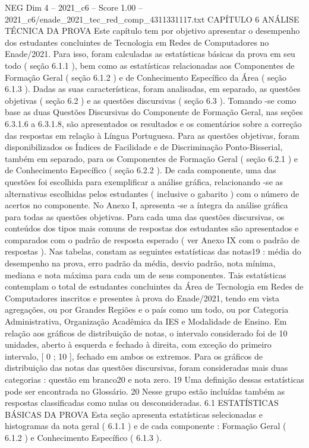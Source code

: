\begin{textsample}{NEG Dim 4 – 2021\_c6 – Score 1.00 – 2021\_c6/enade\_2021\_tec\_red\_comp\_4311331117.txt}  \label{ex:f4_neg_289}
CAPÍTULO 6 ANÁLISE TÉCNICA DA PROVA Este capítulo tem por objetivo apresentar o desempenho dos estudantes concluintes de Tecnologia em Redes de Computadores no Enade/2021.
Para isso, foram calculadas as estatísticas básicas da prova em seu todo ( seção 6.1.1 ), bem como as estatísticas relacionadas aos Componentes de Formação Geral ( seção 6.1.2 ) e de Conhecimento Específico da Área ( seção 6.1.3 ).
Dadas as suas características, foram analisadas, em separado, as questões objetivas ( seção 6.2 ) e as questões discursivas ( seção 6.3 ).
Tomando -se como base as duas Questões Discursivas do Componente de Formação Geral, nas seções 6.3.1.6 a 6.3.1.8, são apresentados os resultados e os comentários sobre a correção das respostas em relação à Língua Portuguesa.
Para as questões objetivas, foram disponibilizados os Índices de Facilidade e de Discriminação Ponto-Bisserial, também em separado, para os Componentes de Formação Geral ( seção 6.2.1 ) e de Conhecimento Específico ( seção 6.2.2 ).
De cada componente, uma das questões foi escolhida para exemplificar a análise gráfica, relacionando -se as alternativas escolhidas pelos estudantes ( inclusive o gabarito ) com o número de acertos no componente.
No Anexo I, apresenta -se a íntegra da análise gráfica para todas as questões objetivas.
Para cada uma das questões discursivas, os conteúdos dos tipos mais comuns de respostas dos estudantes são apresentados e comparados com o padrão de resposta esperado ( ver Anexo IX com o padrão de respostas ).
Nas tabelas, constam as seguintes estatísticas das notas19 : média do desempenho na prova, erro padrão da média, desvio padrão, nota mínima, mediana e nota máxima para cada um de seus componentes.
Tais estatísticas contemplam o total de estudantes concluintes da Área de Tecnologia em Redes de Computadores inscritos e presentes à prova do Enade/2021, tendo em vista agregações, ou por Grandes Regiões e o país como um todo, ou por Categoria Administrativa, Organização Acadêmica da IES e Modalidade de Ensino.
Em relação aos gráficos de distribuição de notas, o intervalo considerado foi de 10 unidades, aberto à esquerda e fechado à direita, com exceção do primeiro intervalo, [ 0 ; 10 ], fechado em ambos os extremos.
Para os gráficos de distribuição das notas das questões discursivas, foram consideradas mais duas categorias : questão em branco20 e nota zero. 19 Uma definição dessas estatísticas pode ser encontrada no Glossário. 20 Nesse grupo estão incluídas também as respostas classificadas como nulas ou desconsideradas. 6.1 ESTATÍSTICAS BÁSICAS DA PROVA Esta seção apresenta estatísticas selecionadas e histogramas da nota geral ( 6.1.1 ) e de cada componente : Formação Geral ( 6.1.2 ) e Conhecimento Específico ( 6.1.3 ).

\end{textsample}

